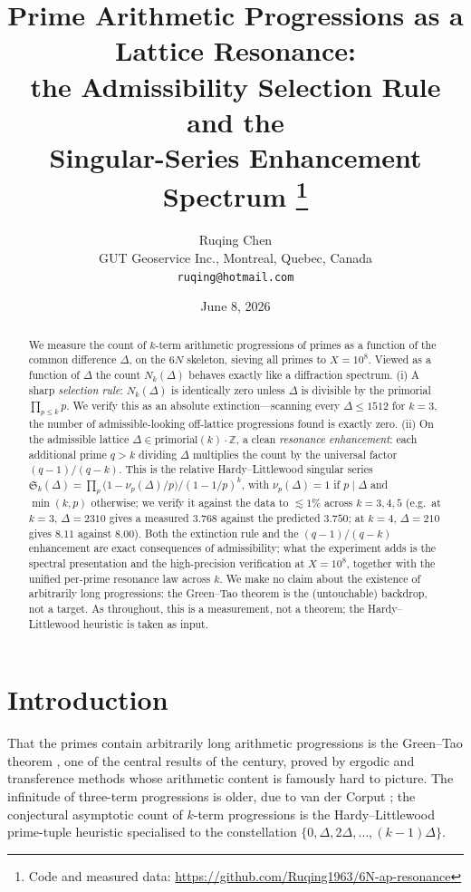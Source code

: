 \documentclass[11pt]{article}
\title{\bf Prime Arithmetic Progressions as a Lattice Resonance:\\
the Admissibility Selection Rule and the\\
Singular-Series Enhancement Spectrum%
\thanks{Code and measured data: \url{https://github.com/Ruqing1963/6N-ap-resonance}}}
\author{Ruqing Chen\\
\small GUT Geoservice Inc., Montreal, Quebec, Canada\\
\small \texttt{ruqing@hotmail.com}}
\date{June 8, 2026}
\theoremstyle{definition}
\newcommand{\Sing}{\mathfrak{S}}
\begin{document}
\maketitle

\begin{abstract}
We measure the count of $k$-term arithmetic progressions of primes as a function of the common
difference $\Delta$, on the $6N$ skeleton, sieving all primes to $X=10^{8}$. Viewed as a function of
$\Delta$ the count $N_k(\Delta)$ behaves exactly like a diffraction spectrum. (i) A sharp
\emph{selection rule}: $N_k(\Delta)$ is identically zero unless $\Delta$ is divisible by the primorial
$\prod_{p\le k}p$. We verify this as an absolute extinction---scanning every $\Delta\le1512$ for
$k=3$, the number of admissible-looking off-lattice progressions found is exactly zero. (ii) On the
admissible lattice $\Delta\in\mathrm{primorial}(k)\cdot\mathbb{Z}$, a clean \emph{resonance
enhancement}: each additional prime $q>k$ dividing $\Delta$ multiplies the count by the universal
factor $(q-1)/(q-k)$. This is the relative Hardy--Littlewood singular series
$\Sing_k(\Delta)=\prod_p\bigl(1-\nu_p(\Delta)/p\bigr)/(1-1/p)^{k}$, with
$\nu_p(\Delta)=1$ if $p\mid\Delta$ and $\min(k,p)$ otherwise; we verify it against the data to
$\lesssim1\%$ across $k=3,4,5$ (e.g.\ at $k=3$, $\Delta=2310$ gives a measured $3.768$ against the
predicted $3.750$; at $k=4$, $\Delta=210$ gives $8.11$ against $8.00$). Both the extinction rule and
the $(q-1)/(q-k)$ enhancement are exact consequences of admissibility; what the experiment adds is the
spectral presentation and the high-precision verification at $X=10^{8}$, together with the unified
per-prime resonance law across $k$. We make no claim about the existence of arbitrarily long
progressions: the Green--Tao theorem is the (untouchable) backdrop, not a target. As throughout, this
is a measurement, not a theorem; the Hardy--Littlewood heuristic is taken as input.
\end{abstract}

\section{Introduction}
That the primes contain arbitrarily long arithmetic progressions is the Green--Tao theorem
\cite{GT}, one of the central results of the century, proved by ergodic and transference methods whose
arithmetic content is famously hard to picture. The infinitude of three-term progressions is older,
due to van der Corput \cite{vdC}; the conjectural asymptotic count of $k$-term progressions is the
Hardy--Littlewood prime-tuple heuristic \cite{HL} specialised to the constellation
$\{0,\Delta,2\Delta,\dots,(k-1)\Delta\}$.
\end{document}
